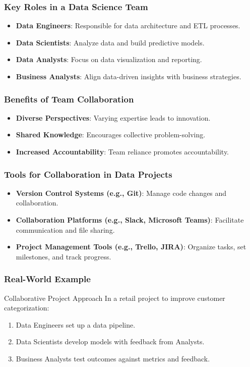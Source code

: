 \documentclass[aspectratio=169]{beamer}
\begin{document}
\begin{frame}[fragile]
    \frametitle{Key Roles in a Data Science Team}
    \begin{itemize}
        \item \textbf{Data Engineers}: Responsible for data architecture and ETL processes.
        \item \textbf{Data Scientists}: Analyze data and build predictive models.
        \item \textbf{Data Analysts}: Focus on data visualization and reporting.
        \item \textbf{Business Analysts}: Align data-driven insights with business strategies.
    \end{itemize}
\end{frame}

\begin{frame}[fragile]
    \frametitle{Benefits of Team Collaboration}
    \begin{itemize}
        \item \textbf{Diverse Perspectives}: Varying expertise leads to innovation.
        \item \textbf{Shared Knowledge}: Encourages collective problem-solving.
        \item \textbf{Increased Accountability}: Team reliance promotes accountability.
    \end{itemize}
\end{frame}

\begin{frame}[fragile]
    \frametitle{Tools for Collaboration in Data Projects}
    \begin{itemize}
        \item \textbf{Version Control Systems (e.g., Git)}: Manage code changes and collaboration.
        \item \textbf{Collaboration Platforms (e.g., Slack, Microsoft Teams)}: Facilitate communication and file sharing.
        \item \textbf{Project Management Tools (e.g., Trello, JIRA)}: Organize tasks, set milestones, and track progress.
    \end{itemize}
\end{frame}

\begin{frame}[fragile]
    \frametitle{Real-World Example}
    \begin{block}{Collaborative Project Approach}
        In a retail project to improve customer categorization:
        \begin{enumerate}
            \item Data Engineers set up a data pipeline.
            \item Data Scientists develop models with feedback from Analysts.
            \item Business Analysts test outcomes against metrics and feedback.
        \end{enumerate}
    \end{block}
\end{frame}
\end{document}
